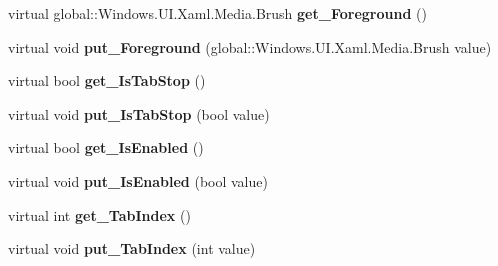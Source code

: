 \begin{DoxyCompactItemize}
\item 
\mbox{\label{class_windows_1_1_u_i_1_1_xaml_1_1_controls_1_1_control_a31608c773e66c230ddaf697df9fbfccb}} 
virtual global\+::\+Windows.\+U\+I.\+Xaml.\+Media.\+Brush {\bfseries get\+\_\+\+Foreground} ()
\item 
\mbox{\label{class_windows_1_1_u_i_1_1_xaml_1_1_controls_1_1_control_aaadea9b23ccdedf4680ffca7d20d7a58}} 
virtual void {\bfseries put\+\_\+\+Foreground} (global\+::\+Windows.\+U\+I.\+Xaml.\+Media.\+Brush value)
\item 
\mbox{\label{class_windows_1_1_u_i_1_1_xaml_1_1_controls_1_1_control_a4aed62fb59fe596d9d9727b4fa885234}} 
virtual bool {\bfseries get\+\_\+\+Is\+Tab\+Stop} ()
\item 
\mbox{\label{class_windows_1_1_u_i_1_1_xaml_1_1_controls_1_1_control_a494c6dd6af97e18d86690cb2cae23c3d}} 
virtual void {\bfseries put\+\_\+\+Is\+Tab\+Stop} (bool value)
\item 
\mbox{\label{class_windows_1_1_u_i_1_1_xaml_1_1_controls_1_1_control_ad11dee8e9b7e09556e69903cade192dd}} 
virtual bool {\bfseries get\+\_\+\+Is\+Enabled} ()
\item 
\mbox{\label{class_windows_1_1_u_i_1_1_xaml_1_1_controls_1_1_control_ae951ae9f8506d85d623dc31713092569}} 
virtual void {\bfseries put\+\_\+\+Is\+Enabled} (bool value)
\item 
\mbox{\label{class_windows_1_1_u_i_1_1_xaml_1_1_controls_1_1_control_a58eef00fd623bde61c10893d9205700b}} 
virtual int {\bfseries get\+\_\+\+Tab\+Index} ()
\item 
\mbox{\label{class_windows_1_1_u_i_1_1_xaml_1_1_controls_1_1_control_a8314612345a1e430bb7f8d51cdb9b131}} 
virtual void {\bfseries put\+\_\+\+Tab\+Index} (int value)
\item 

\end{DoxyCompactItemize}
